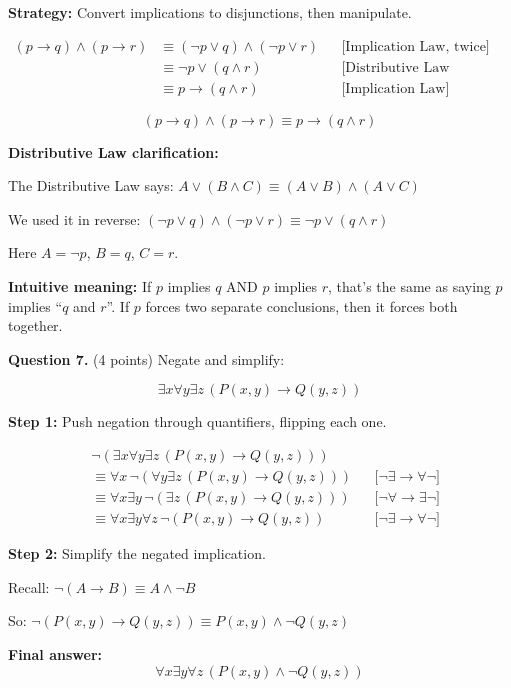 \documentclass[11pt,a4paper]{article}
\begin{document}
\begin{solnbox}
\textbf{Strategy:} Convert implications to disjunctions, then manipulate.

\begin{align*}
(p \to q) \land (p \to r) &\equiv (\neg p \lor q) \land (\neg p \lor r) && \text{[Implication Law, twice]} \\
&\equiv \neg p \lor (q \land r) && \text{[Distributive Law (reverse)]} \\
&\equiv p \to (q \land r) && \text{[Implication Law]}
\end{align*}

$$\boxed{(p \to q) \land (p \to r) \equiv p \to (q \land r)}$$

\textbf{Distributive Law clarification:}

The Distributive Law says: $A \lor (B \land C) \equiv (A \lor B) \land (A \lor C)$

We used it in reverse: $(\neg p \lor q) \land (\neg p \lor r) \equiv \neg p \lor (q \land r)$

Here $A = \neg p$, $B = q$, $C = r$.

\textbf{Intuitive meaning:} If $p$ implies $q$ AND $p$ implies $r$, that's the same as saying $p$ implies ``$q$ and $r$''. If $p$ forces two separate conclusions, then it forces both together.
\end{solnbox}

\vspace{15pt}

\textbf{Question 7.} (4 points) Negate and simplify:

$$\exists x \forall y \exists z\, (P(x, y) \to Q(y, z))$$

\begin{solnbox}
\textbf{Step 1:} Push negation through quantifiers, flipping each one.

\begin{align*}
&\neg(\exists x \forall y \exists z\, (P(x,y) \to Q(y,z))) \\
&\equiv \forall x\, \neg(\forall y \exists z\, (P(x,y) \to Q(y,z))) && \text{[$\neg\exists \to \forall\neg$]} \\
&\equiv \forall x \exists y\, \neg(\exists z\, (P(x,y) \to Q(y,z))) && \text{[$\neg\forall \to \exists\neg$]} \\
&\equiv \forall x \exists y \forall z\, \neg(P(x,y) \to Q(y,z)) && \text{[$\neg\exists \to \forall\neg$]}
\end{align*}

\textbf{Step 2:} Simplify the negated implication.

Recall: $\neg(A \to B) \equiv A \land \neg B$

So: $\neg(P(x,y) \to Q(y,z)) \equiv P(x,y) \land \neg Q(y,z)$

\textbf{Final answer:}
$$\boxed{\forall x \exists y \forall z\, (P(x,y) \land \neg Q(y,z))}$$
\end{solnbox}
\end{document}
